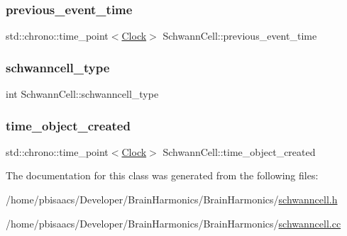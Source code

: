\subsubsection{\texorpdfstring{previous\+\_\+event\+\_\+time}{previous\_event\_time}}
{\footnotesize\ttfamily std\+::chrono\+::time\+\_\+point$<$\mbox{\hyperlink{universe_8h_a0ef8d951d1ca5ab3cfaf7ab4c7a6fd80}{Clock}}$>$ Schwann\+Cell\+::previous\+\_\+event\+\_\+time\hspace{0.3cm}{\ttfamily [private]}}

\mbox{\label{classSchwannCell_a6b045b7f7bf629cd9f75b58c40f5b7c1}} 
\subsubsection{\texorpdfstring{schwanncell\+\_\+type}{schwanncell\_type}}
{\footnotesize\ttfamily int Schwann\+Cell\+::schwanncell\+\_\+type\hspace{0.3cm}{\ttfamily [private]}}

\mbox{\label{classSchwannCell_ac5c518c34e3c2afb70bc2780c1b74439}} 
\subsubsection{\texorpdfstring{time\+\_\+object\+\_\+created}{time\_object\_created}}
{\footnotesize\ttfamily std\+::chrono\+::time\+\_\+point$<$\mbox{\hyperlink{universe_8h_a0ef8d951d1ca5ab3cfaf7ab4c7a6fd80}{Clock}}$>$ Schwann\+Cell\+::time\+\_\+object\+\_\+created\hspace{0.3cm}{\ttfamily [private]}}



The documentation for this class was generated from the following files\+:\begin{DoxyCompactItemize}
\item 
/home/pbisaacs/\+Developer/\+Brain\+Harmonics/\+Brain\+Harmonics/\mbox{\hyperlink{schwanncell_8h}{schwanncell.\+h}}\item 
/home/pbisaacs/\+Developer/\+Brain\+Harmonics/\+Brain\+Harmonics/\mbox{\hyperlink{schwanncell_8cc}{schwanncell.\+cc}}\end{DoxyCompactItemize}
